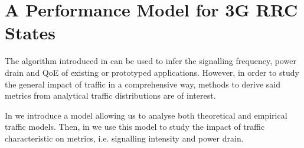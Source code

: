 \section{A Performance Model for 3G RRC States}\label{sec:network:performance_model}
The algorithm introduced in  can be used to infer the signalling frequency, power drain and \gls{QoE} of existing or prototyped applications.
However, in order to study the general impact of traffic in a comprehensive way, methods to derive said metrics from analytical traffic distributions are of interest.

In  we introduce a model allowing us to 
analyse both theoretical and empirical traffic models.
Then, in  we use this model to study the impact of traffic characteristic on metrics, i.e. signalling intensity and power drain.



